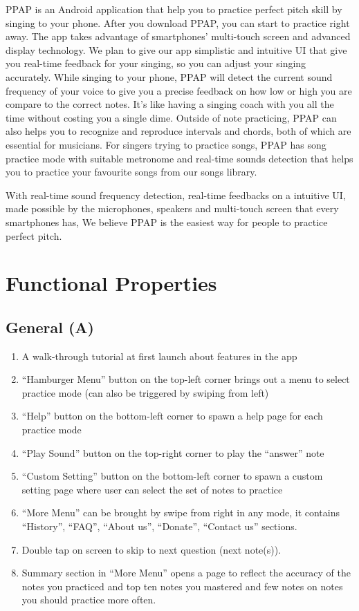 \documentclass{article}
\begin{document}
PPAP is an Android application that help you to practice perfect pitch skill by singing to your phone. After you download PPAP, you can start to practice right away. The app takes advantage of smartphones’ multi-touch screen and advanced display technology. We plan to give our app simplistic and intuitive UI that give you real-time feedback for your singing, so you can adjust your singing accurately. While singing to your phone, PPAP will detect the current sound frequency of your voice to give you a precise feedback on how low or high you are compare to the correct notes. It’s like having a singing coach with you all the time without costing you a single dime. Outside of note practicing, PPAP can also helps you to recognize and reproduce intervals and chords, both of which are essential for musicians. For singers trying to practice songs, PPAP has song practice mode with suitable metronome and real-time sounds detection that helps you to practice your favourite songs from our songs library.

With real-time sound frequency detection, real-time feedbacks on a intuitive UI, made possible by the microphones, speakers and multi-touch screen that every smartphones has, We believe PPAP is the easiest way for people to practice perfect pitch.

\newpage
\section{Functional Properties}
\subsection{General (A)}
\begin{enumerate}
  \item A walk-through tutorial at first launch about features in the app
  \item “Hamburger Menu” button on the top-left corner brings out a menu to select practice mode (can also be triggered by swiping from left)
  \item “Help” button on the bottom-left corner to spawn a help page for each practice mode
  \item “Play Sound” button on the top-right corner to play the “answer” note
  \item “Custom Setting” button on the bottom-left corner to spawn a custom setting page where user can select the set of notes to practice
  \item “More Menu” can be brought by swipe from right in any mode, it contains “History”, “FAQ”, “About us”, “Donate”, “Contact us” sections.
  \item Double tap on screen to skip to next question (next note(s)).
  \item Summary section in “More Menu” opens a page to reflect the accuracy of the notes you practiced and top ten notes you mastered and few notes on notes you should practice more often. 
\end{enumerate}
\end{document}

